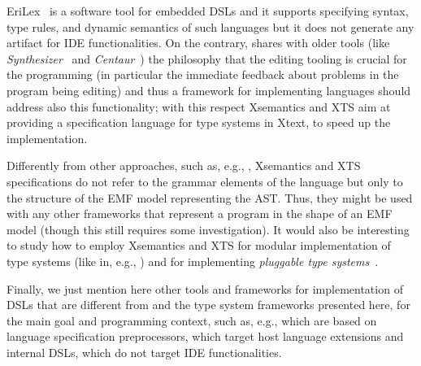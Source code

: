 EriLex~\cite{EriLex} is a software tool for embedded DSLs and it supports
specifying syntax, type rules, and dynamic semantics of such languages but it
does not generate any artifact for IDE functionalities.
On the contrary, \xtext{} shares with older tools (like
\emph{Synthesizer}~\cite{Synthesizer} and \emph{Centaur}~\cite{Centaur}) the
philosophy that the editing tooling is crucial for the programming (in
particular the immediate feedback about problems in the program being editing)
and thus a framework for implementing languages should address also this
functionality; with this respect Xsemantics and XTS aim at providing a
specification language for type systems in Xtext, to speed up the
implementation.

Differently from other approaches, such as, e.g.,
\cite{Centaur,MPS,ASFSDF,Ruler,PLTRedex,EriLex,Neverlang2010}, Xsemantics and
XTS specifications do not refer to the grammar elements of the language but only
to the structure of the EMF model representing the AST.  Thus, they might be
used with any other frameworks that represent a program in the shape of an EMF
model (though this still requires some investigation).
It would also be interesting to study how to employ Xsemantics and XTS for
modular implementation of type systems (like in, e.g.,
\cite{JastAdd,Neverlang2010,Spoofax2010}) and for implementing \emph{pluggable
type systems}~\cite{Brac04a}.


Finally, we just mention here other tools and frameworks for implementation of
DSLs that are different from \xtext{} and the type system frameworks presented
here, for the main goal and programming context, such as, e.g.,
\cite{JST98,MetaBorg06,MontiCore10} which are based on language specification
preprocessors, \cite{XMF08,LanguageBoxes09} which target host language
extensions and internal DSLs, \cite{ASFSDF,Ruler,PLTRedex} which do not target
IDE functionalities.